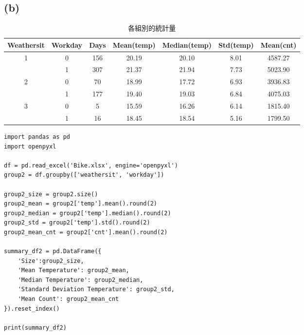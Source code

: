 \documentclass{article}
\begin{document}
\subsection*{(b)}
\begin{table}[h!]
\centering
\begin{tabular}{|c|c|c|c|c|c|c|}
\hline
Weathersit & Workday & Days & Mean(temp) & Median(temp) & Std(temp) & Mean(cnt) \\ \hline
\multirow{2}{*}{1} & 0 & 156 & 20.19 & 20.10 & 8.01 & 4587.27 \\ \cline{2-7}
\cline{2-7}
 & 1 & 307 & 21.37 & 21.94 & 7.73 & 5023.90 \\ \hline
\multirow{2}{*}{2} & 0 & 70 & 18.99 & 17.72 & 6.93 & 3936.83 \\ \cline{2-7}
\cline{2-7}
 & 1 & 177 & 19.40 & 19.03 & 6.84 & 4075.03 \\ \hline
\multirow{2}{*}{3} & 0 & 5 & 15.59 & 16.26 & 6.14 & 1815.40 \\ \cline{2-7}
\cline{2-7}
 & 1 & 16 & 18.45 & 18.54 & 5.16 & 1799.50 \\ \hline
\end{tabular}
\caption{各組別的統計量}
\label{tab:example}
\end{table}
\begin{lstlisting}[caption={(b)小題的 Python Code}]
import pandas as pd
import openpyxl

df = pd.read_excel('Bike.xlsx', engine='openpyxl')
group2 = df.groupby(['weathersit', 'workday'])

group2_size = group2.size()
group2_mean = group2['temp'].mean().round(2)
group2_median = group2['temp'].median().round(2)
group2_std = group2['temp'].std().round(2)
group2_mean_cnt = group2['cnt'].mean().round(2)

summary_df2 = pd.DataFrame({
    'Size':group2_size,
    'Mean Temperature': group2_mean,
    'Median Temperature': group2_median,
    'Standard Deviation Temperature': group2_std,
    'Mean Count': group2_mean_cnt
}).reset_index()

print(summary_df2)
\end{lstlisting}
\end{document}
